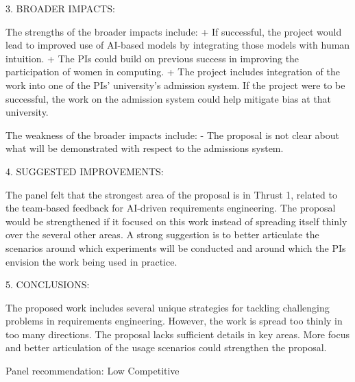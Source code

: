 3. BROADER IMPACTS:



The strengths of the broader impacts include:
+ If successful, the project would lead to improved use of AI-based models by integrating those models with human intuition.
+ The PIs could build on previous success in improving the participation of women in computing.
+ The project includes integration of the work into one of the PIs' university’s admission system. If the project were to be successful, the work on the admission system could help mitigate bias at that university.

The weakness of the broader impacts include:
- The proposal is not clear about what will be demonstrated with respect to the admissions system.



4. SUGGESTED IMPROVEMENTS:



The panel felt that the strongest area of the proposal is in Thrust 1, related to the team-based feedback for AI-driven requirements engineering. The proposal would be strengthened if it focused on this work instead of spreading itself thinly over the several other areas. A strong suggestion is to better articulate the scenarios around which experiments will be conducted and around which the PIs envision the work being used in practice.



5. CONCLUSIONS:


The proposed work includes several unique strategies for tackling challenging problems in requirements engineering. However, the work is spread too thinly in too many directions. The proposal lacks sufficient details in key areas. More focus and better articulation of the usage scenarios could strengthen the proposal.



Panel recommendation: Low Competitive